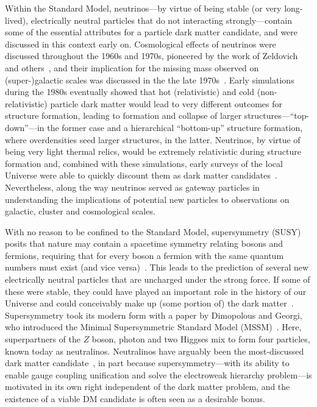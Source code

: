 Within the Standard Model, neutrinos---by virtue of being stable (or very long-lived), electrically neutral particles that do not interacting strongly---contain some of the essential attributes for a particle dark matter candidate, and were discussed in this context early on. Cosmological effects of neutrinos were discussed throughout the 1960s and 1970s, pioneered by the work of Zeldovich and others~\cite{Gershtein:1966gg,PhysRevLett.29.669}, and their implication for the missing mass observed on (super-)galactic scales was discussed in the the late 1970s~\cite{PhysRevLett.39.165,1978ApJ...223.1015G}. Early simulations during the 1980s eventually showed that hot (relativistic) and cold (non-relativistic) particle dark matter would lead to very different outcomes for structure formation, leading to formation and collapse of larger structures---``top-down''---in the former case and a hierarchical ``bottom-up'' structure formation, where overdensities seed larger structures, in the latter. Neutrinos, by virtue of being very light thermal relics, would be extremely relativistic during structure formation and, combined with these simulations, early surveys of the local Universe were able to quickly discount them as dark matter candidates~\cite{1983ApJ...274L...1W}. Nevertheless, along the way neutrinos served as gateway particles in understanding the implications of potential new particles to observations on galactic, cluster and cosmological scales.

With no reason to be confined to the Standard Model, supersymmetry (SUSY) posits that nature may contain a spacetime symmetry relating bosons and fermions, requiring that for every boson a fermion with the same quantum numbers must exist (and vice versa)~\cite{Wess:1974tw,PhysRevLett.48.223}. This leads to the prediction of several new electrically neutral particles that are uncharged under the strong force. If some of these were stable, they could have played an important role in the history of our Universe and could conceivably make up (some portion of) the dark matter~\cite{Jungman:1995df}. Supersymmetry took its modern form with a paper by Dimopolous and Georgi, who introduced the Minimal Supersymmetric Standard Model (MSSM)~\cite{Dimopoulos:1981zb}. Here, superpartners of the $Z$ boson, photon and two Higgses mix to form four particles, known today as neutralinos. Neutralinos have arguably been the most-discussed dark matter candidate~\cite{Bertone:2004pz}, in part because supersymmetry---with its ability to enable gauge coupling unification and solve the electroweak hierarchy problem---is motivated in its own right independent of the dark matter problem, and the existence of a viable DM candidate is often seen as a desirable bonus.

